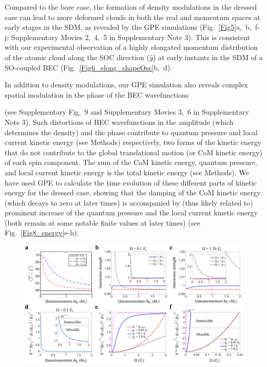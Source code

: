 \documentclass[showpacs,preprintnumbers,amsmath,amssymb, superscriptaddress, aps, reprint]{revtex4-1}
\begin{document}
{{Compared to the bare case, the formation of density modulations in the dressed case can lead to more deformed clouds in both the real and momentum spaces at early stages in the SDM, as revealed by the GPE simulations (Fig.~{\ref{Fig5}}a,~b,~f-j; Supplementary Movies 2,~4,~5 in Supplementary Note 3). This is consistent with our experimental observation of a highly elongated momentum distribution of the atomic cloud along the SOC direction ($\hat{y}$) at early instants in the SDM of a SO-coupled BEC (Fig.~{\ref{Fig6_elong_shapeOsc}}b,~d).

In addition to density modulations, our GPE simulation also reveals complex spatial modulation in the phase of the BEC wavefunctions {(see Supplementary Fig.~9 and Supplementary Movies 3,~6 in Supplementary Note 3). Such distortions of BEC wavefunctions in the amplitude (which determines the density) and the phase contribute to quantum pressure \cite{Stringari_RevModPhys1999} and local current kinetic energy ({see Methods}) respectively, two forms of the kinetic energy that do not contribute to the global {translational} motion (or CoM kinetic energy) of each spin component. The sum of the CoM kinetic energy, quantum pressure, and local current kinetic energy is the total kinetic energy ({see Methods}). We have used GPE to calculate the time evolution of these different parts of kinetic energy for the dressed case, showing that the damping of the CoM kinetic energy (which decays to zero at later times) is accompanied by (thus likely related to) prominent increase of the quantum pressure and the local current kinetic energy (both remain at some notable finite values at later times) ({see Fig.~{\ref{Fig8_energy}}e-h}).
\begin{figure}[ht]
\includegraphics[width=6.5in]{Fig7_eff_interaction_Vfinal.pdf}

\end{figure}}}}
\end{document}
